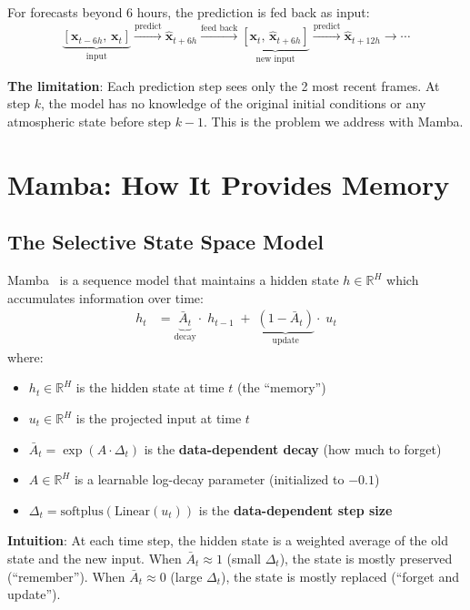 \documentclass[11pt,a4paper]{article}
\begin{document}
For forecasts beyond 6 hours, the prediction is fed back as input:
\[
\underbrace{[\mathbf{x}_{t-6h},\, \mathbf{x}_t]}_{\text{input}} \xrightarrow{\text{predict}} \hat{\mathbf{x}}_{t+6h} \xrightarrow{\text{feed back}} \underbrace{[\mathbf{x}_t,\, \hat{\mathbf{x}}_{t+6h}]}_{\text{new input}} \xrightarrow{\text{predict}} \hat{\mathbf{x}}_{t+12h} \to \cdots
\]

\textbf{The limitation}: Each prediction step sees only the 2 most recent frames. At step $k$, the model has no knowledge of the original initial conditions or any atmospheric state before step $k{-}1$. This is the problem we address with Mamba.

\section{Mamba: How It Provides Memory}

\subsection{The Selective State Space Model}

Mamba~\cite{gu2023mamba} is a sequence model that maintains a hidden state $h \in \mathbb{R}^H$ which accumulates information over time:
\begin{align}
  h_t &= \underbrace{\bar{A}_t}_{\text{decay}} \cdot\; h_{t-1} \;+\; \underbrace{(1 - \bar{A}_t)}_{\text{update}} \cdot\; u_t \label{eq:state_update}
\end{align}
where:
\begin{itemize}[nosep]
  \item $h_t \in \mathbb{R}^H$ is the hidden state at time $t$ (the ``memory'')
  \item $u_t \in \mathbb{R}^H$ is the projected input at time $t$
  \item $\bar{A}_t = \exp(A \cdot \Delta_t)$ is the \textbf{data-dependent decay} (how much to forget)
  \item $A \in \mathbb{R}^H$ is a learnable log-decay parameter (initialized to $-0.1$)
  \item $\Delta_t = \text{softplus}(\text{Linear}(u_t))$ is the \textbf{data-dependent step size}
\end{itemize}

\textbf{Intuition}: At each time step, the hidden state is a weighted average of the old state and the new input. When $\bar{A}_t \approx 1$ (small $\Delta_t$), the state is mostly preserved (``remember''). When $\bar{A}_t \approx 0$ (large $\Delta_t$), the state is mostly replaced (``forget and update'').
\end{document}
